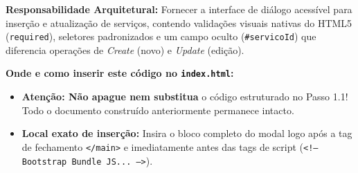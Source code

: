 \clearpage
\begin{boxAtividade}
\textbf{Responsabilidade Arquitetural:} Fornecer a interface de diálogo acessível para inserção e atualização de serviços, contendo validações visuais nativas do HTML5 (\texttt{required}), seletores padronizados e um campo oculto (\texttt{\#servicoId}) que diferencia operações de \textit{Create} (novo) e \textit{Update} (edição).
\end{boxAtividade}

\begin{tcolorbox}[
    colback=azulTitulo!5, colframe=azulTitulo!80,
    boxrule=0.8pt, arc=4pt, left=8pt, right=8pt, top=6pt, bottom=6pt
]
\textbf{\color{azulTitulo}Onde e como inserir este código no \texttt{index.html}:}
\begin{itemize}[leftmargin=*, nosep]
  \item \textbf{Atenção: Não apague nem substitua} o código estruturado no Passo 1.1! Todo o documento construído anteriormente permanece intacto.
  \item \textbf{Local exato de inserção:} Insira o bloco completo do modal logo após a tag de fechamento \texttt{</main>} e imediatamente antes das tags de script (\texttt{<!-- Bootstrap Bundle JS... -->}).
\end{itemize}
\end{tcolorbox}

